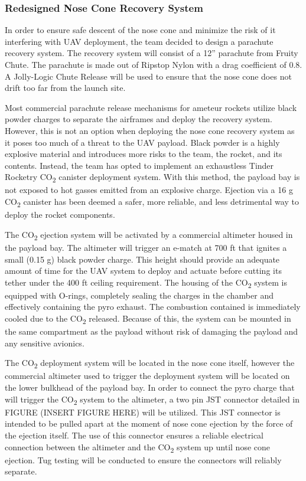 		\subsubsection{Redesigned Nose Cone Recovery System}
        In order to ensure safe descent of the nose cone and minimize the risk of it interfering with UAV deployment, the team decided to design a parachute recovery system. The recovery system will consist of a 12” parachute from Fruity Chute. The parachute is made out of Ripstop Nylon with a drag coefficient of 0.8. A Jolly-Logic Chute Release will be used to ensure that the nose cone does not drift too far from the launch site.

        Most commercial parachute release mechanisms for ameteur rockets utilize black powder charges to separate the airframes and deploy the recovery system. However, this is not an option when deploying the nose cone recovery system as it poses too much of a threat to the UAV payload. Black powder is a highly explosive material and introduces more risks to the team, the rocket, and its contents. Instead, the team has opted to implement an exhaustless Tinder Rocketry CO\textsubscript{2} canister deployment system. With this method, the payload bay is not exposed to hot gasses emitted from an explosive charge. Ejection via a 16 g CO\textsubscript{2} canister has been deemed a safer, more reliable, and less detrimental way to deploy the rocket components. 
        
        The CO\textsubscript{2} ejection system will be activated by a commercial altimeter housed in the payload bay. The altimeter will trigger an e-match at 700 ft that ignites a small (0.15 g) black powder charge. This height should provide an adequate amount of time for the UAV system to deploy and actuate before cutting its tether under the 400 ft ceiling requirement. The housing of the CO\textsubscript{2} system is equipped with O-rings, completely sealing the charges in the chamber and effectively containing the pyro exhaust. The combustion contained is immediately cooled due to the CO\textsubscript{2} released. Because of this, the system can be mounted in the same compartment as the payload without risk of damaging the payload and any sensitive avionics. 
        
        The CO\textsubscript{2} deployment system will be located in the nose cone itself, however the commercial altimeter used to trigger the deployment system will be located on the lower bulkhead of the payload bay. In order to connect the pyro charge that will trigger the CO\textsubscript{2} system to the altimeter, a two pin JST connector detailed in FIGURE (INSERT FIGURE HERE) will be utilized. This JST connector is intended to be pulled apart at the moment of nose cone ejection by the force of the ejection itself. The use of this connector ensures a reliable electrical connection between the altimeter and the CO\textsubscript{2} system up until nose cone ejection. Tug testing will be conducted to ensure the connectors will reliably separate. 

